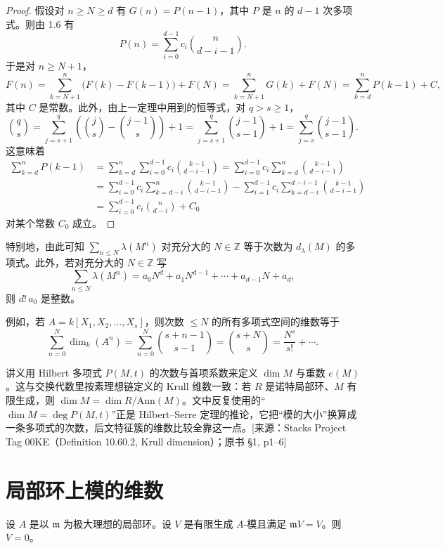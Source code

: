 \begin{proof}
假设对 $n\ge N\ge d$ 有 $G(n)=P(n-1)$，其中 $P$ 是 $n$ 的 $d-1$ 次多项式。则由 1.6 有
$$P(n)=\sum_{i=0}^{d-1}c_i\binom{n}{d-i-1}.$$
于是对 $n\ge N+1$，
$$F(n)=\sum_{k=N+1}^{n}\bigl(F(k)-F(k-1)\bigr)+F(N)=\sum_{k=N+1}^{n}G(k)+F(N)=\sum_{k=d}^{n}P(k-1)+C,$$
其中 $C$ 是常数。此外，由上一定理中用到的恒等式，对 $q>s\ge 1$，
$$\binom{q}{s}=\sum_{j=s+1}^{q}\left(\binom{j}{s}-\binom{j-1}{s}\right)+1=\sum_{j=s+1}^{q}\binom{j-1}{s-1}+1=\sum_{j=s}^{q}\binom{j-1}{s-1}.$$
这意味着
\begin{align*}
\sum_{k=d}^{n}P(k-1)&=\sum_{k=d}^{n}\sum_{i=0}^{d-1}c_i\binom{k-1}{d-i-1}=\sum_{i=0}^{d-1}c_i\sum_{k=d}^{n}\binom{k-1}{d-i-1}\\
&=\sum_{i=0}^{d-1}c_i\sum_{k=d-i}^{n}\binom{k-1}{d-i-1}-\sum_{i=1}^{d-1}c_i\sum_{k=d-i}^{d-i-1}\binom{k-1}{d-i-1}\\
&=\sum_{i=0}^{d-1}c_i\binom{n}{d-i}+C_0
\end{align*}
对某个常数 $C_0$ 成立。
\end{proof}

特别地，由此可知 $\sum_{n\le N}\lambda(M^n)$ 对充分大的 $N\in\mathbb{Z}$ 等于次数为 $d_\lambda(M)$ 的多项式。此外，若对充分大的 $N\in\mathbb{Z}$ 写
$$\sum_{n\le N}\lambda(M^n)=a_0 N^d+a_1 N^{d-1}+\cdots+a_{d-1}N+a_d,$$
则 $d!\,a_0$ 是整数。

例如，若 $A=k[X_1,X_2,\dots,X_s]$，则次数 $\le N$ 的所有多项式空间的维数等于
$$\sum_{n=0}^{N}\dim_k(A^n)=\sum_{n=0}^{N}\binom{s+n-1}{s-1}=\binom{s+N}{s}=\frac{N^s}{s!}+\cdots.$$
\begin{annote}
讲义用 Hilbert 多项式 $P(M,t)$ 的次数与首项系数来定义 $\dim M$ 与重数 $e(M)$。这与交换代数里按素理想链定义的 Krull 维数一致：若 $R$ 是诺特局部环、$M$ 有限生成，则 $\dim M=\dim R/\mathrm{Ann}(M)$。文中反复使用的“$\dim M=\deg P(M,t)$”正是 Hilbert–Serre 定理的推论，它把“模的大小”换算成一条多项式的次数，后文特征簇的维数比较全靠这一点。[来源：Stacks Project Tag 00KE（Definition 10.60.2, Krull dimension）；原书 §1, p1–6]
\end{annote}



\section{局部环上模的维数}

\begin{lemma}[Nakayama]
设 $A$ 是以 $\mathfrak{m}$ 为极大理想的局部环。设 $V$ 是有限生成 $A$-模且满足 $\mathfrak{m}V=V$。则 $V=0$。
\end{lemma}


